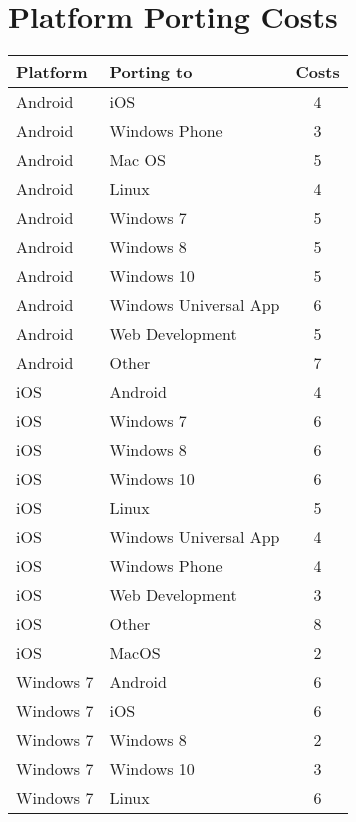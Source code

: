 \section{Platform Porting Costs}
\begin{table}[h]
	\centering 
	\setlength{\tabcolsep}{4pt}
	\begin{tabular}{|l|l|c|}\hline
		Platform			& Porting to 	&  Costs 	\\ \hline
		Android   			& iOS					& 4      		\\ \hline
		Android   			& Windows Phone 		& 3      		\\ \hline
		Android   			& Mac OS 				& 5     		\\ \hline
		Android   			& Linux 				& 4     		\\ \hline
		Android  			& Windows 7 			& 5     		\\ \hline
		Android  			& Windows 8				& 5     		\\ \hline
		Android  			& Windows 10 			& 5     		\\ \hline
		Android  			& Windows Universal App	& 6     		\\ \hline
		Android  			& Web Development 		& 5     		\\ \hline
		Android  			& Other 				& 7     		\\ \hline
		iOS  			& Android 				& 4     		\\ \hline
		iOS  			& Windows 7 				& 6     		\\ \hline
		iOS  			& Windows 8 				& 6     		\\ \hline
		iOS  			& Windows 10 				& 6     		\\ \hline
		iOS  			& Linux 				& 5     		\\ \hline
		iOS  			& Windows Universal App 				& 4     		\\ \hline
		iOS  			& Windows Phone 				& 4     		\\ \hline
		iOS  			& Web Development 				& 3     		\\ \hline
		iOS  			& Other 				& 8     		\\ \hline
		iOS  			& MacOS 				& 2     		\\ \hline
		Windows 7  			& Android 				& 6     		\\ \hline
		Windows 7  			& iOS 				& 6     		\\ \hline
		Windows 7  			& Windows 8 				& 2     		\\ \hline
		Windows 7  			& Windows 10 				& 3     		\\ \hline
		Windows 7  			& Linux 				& 6     		\\ \hline

\end{tabular}
\end{table}
